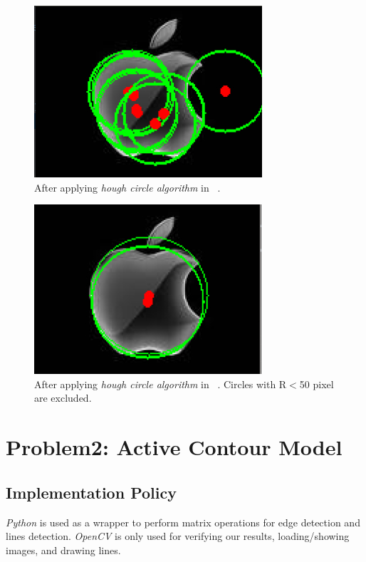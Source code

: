 \documentclass[letterpaper, 12 pt, conference ,onecolumn]{ieeeconf}  %
\begin{document}
\begin{figure}[h!]
\includegraphics[width=0.4\paperwidth]{hough-circles/apple-circles1.jpg}
\caption{After applying \textit{hough circle algorithm} in ~.}
\label{fig:apple1-circles1}
\end{figure}

\begin{figure}[h!]
\includegraphics[width=0.4\paperwidth]{hough-circles/apple-circles2.jpg}
\caption{After applying \textit{hough circle algorithm} in ~. Circles with R$<$50 pixel are excluded.}
\label{fig:apple1-circles2}
\end{figure}

\section{Problem2: Active Contour Model}
\subsection{Implementation Policy}\label{implementation-policy}

\textit{Python} is used as a wrapper to perform matrix operations for edge detection and lines detection. \textit{OpenCV} is only used for verifying our results, loading/showing images, and drawing lines.
\end{document}
